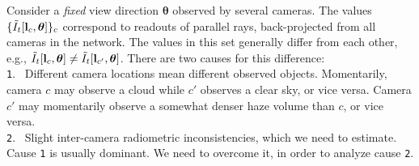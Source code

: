\documentclass[runningheads]{llncs}
\begin{document}
Consider a {\em fixed} view direction ${\bm \theta}$ observed by several cameras.
The values $\{\tilde I_t[{\bf l}_c,{\bm \theta}]\}_c$ correspond to readouts of parallel rays, back-projected from all cameras in the network. The values in this set generally differ from each other, e.g.,
 $\tilde I_t[{\bf l}_c,{\bm \theta}]\neq \tilde I_t[{\bf l}_{c'},{\bm \theta}]$. There are two causes for this difference:\\
 {\tt 1}.~ Different camera locations mean different observed objects. Momentarily, camera $c$ may observe a cloud while $c'$ observes a clear sky, or vice versa. Camera $c'$ may momentarily observe a somewhat denser haze volume than $c$, or vice versa. \\
 {\tt 2}.~ Slight inter-camera radiometric inconsistencies, which we need to estimate.\\
 Cause {\tt 1} is usually dominant. We need to overcome it, in order to analyze cause {\tt 2}.
\end{document}
